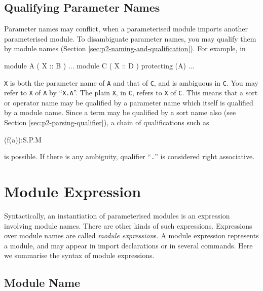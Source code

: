 \documentclass[a4paper]{memoir}
\begin{document}

\subsection{Qualifying Parameter Names}

Parameter names may conflict, when a parameterised module imports
another parameterised module. To disambiguate parameter names, you may
qualify them by module names
(Section \ref{sec:p2-naming-and-qualification}). For example, in
\begin{vvtm}
\begin{ccode}
  module A ( X :: B ) { ... }
  module C ( X :: D ) {
    protecting (A)
    ...
  }
\end{ccode}
\end{vvtm}
\verb|X| is both the parameter name of \verb|A| and that of \verb|C|,
and is ambiguous in \verb|C|. You may refer to \verb|X| of \verb|A|
by ``\verb|X.A|''. The plain \verb|X|, in \verb|C|, refers to \verb|X|
of \verb|C|. This means that a sort or operator name may be
qualified by a parameter name which itself is qualified by a module
name. Since a term may be qualified by a sort name also
(see Section \ref{sec:p2-parsing-qualifier}), a chain of qualifications
such as
\begin{vvtm}
\begin{ccode}
  (f(a)):S.P.M
\end{ccode}
\end{vvtm}
is possible. If there is any ambiguity, qualifier ``\verb|.|'' is
considered right associative.

\section{Module Expression}\label{sec:p2-module-expression}

Syntactically, an instantiation of parameterised modules is an expression
involving module names. There are other kinds of such expressions.
Expressions over module names are called {\em module expression\/}s.
A module expression represents a module,
and may appear in import declarations or in several commands.
Here we summarise the syntax of module expressions.

\subsection{Module Name}
\end{document}
